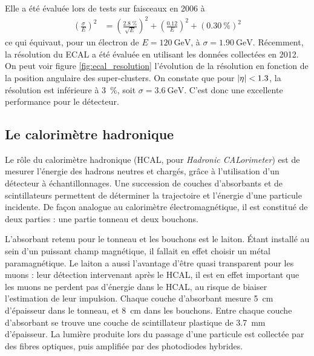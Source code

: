 Elle a été évaluée lors de tests sur faisceaux en 2006 à
\begin{align*}
  \left( \frac{\sigma}{E} \right)^2 &= \left( \frac{\SI{2.8}{\%}}{\sqrt{E}} \right)^2 + \left( \frac{\num{0.12}}{E} \right)^2 + \left(\SI{0.30}{\%}\right)^2
\end{align*}
ce qui équivaut, pour un électron de $E = \SI{120}{\GeV}$, à $\sigma = \SI{1.90}{\GeV}$. Récemment, la résolution du ECAL a été évaluée en utilisant les données collectées en 2012. On peut voir figure \ref{fig:ecal_resolution} l'évolution de la résolution en fonction de la position angulaire des super-clusters. On constate que pour $\lvert \eta \rvert < 1.3$, la résolution est inférieure à \SI{3}{\%}, soit $\sigma = \SI{3.6}{\GeV}$. C'est donc une excellente performance pour le détecteur.

\subsection{Le calorimètre hadronique} \label{sec:hcal}

Le rôle du calorimètre hadronique (HCAL, pour \emph{Hadronic CALorimeter}) est de mesurer l'énergie des hadrons neutres et chargés, grâce à l'utilisation d'un détecteur à échantillonnages. Une succession de couches d'absorbants et de scintillateurs permettent de déterminer la trajectoire et l'énergie d'une particule incidente. De façon analogue au calorimètre électromagnétique, il est constitué de deux parties : une partie tonneau et deux bouchons.

L'absorbant retenu pour le tonneau et les bouchons est le laiton. Étant installé au sein d'un puissant champ magnétique, il fallait en effet choisir un métal paramagnétique. Le laiton a aussi l'avantage d'être quasi transparent pour les muons : leur détection intervenant après le HCAL, il est en effet important que les muons ne perdent pas d'énergie dans le HCAL, au risque de biaiser l'estimation de leur impulsion. Chaque couche d'absorbant mesure \SI{5}{\cm} d'épaisseur dans le tonneau, et \SI{8}{\cm} dans les bouchons. Entre chaque couche d'absorbant se trouve une couche de scintillateur plastique de \SI{3.7}{\mm} d'épaisseur. La lumière produite lors du passage d'une particule est collectée par des fibres optiques, puis amplifiée par des photodiodes hybrides.

\medskip

